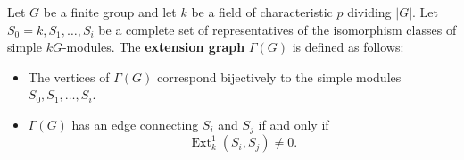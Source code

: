 Let $G$ be a finite group and let $k$ be a field of characteristic $p$ dividing $|G|$. Let $S_0 = k, S_1, \ldots, S_i$ be a complete set of representatives of the isomorphism classes of simple $kG$-modules. The \textbf{extension graph} $\Gamma(G)$ is defined as follows:
\begin{itemize}
\item The vertices of $\Gamma(G)$ correspond bijectively to the simple modules $S_0, S_1, \ldots, S_i$.
\item $\Gamma(G)$ has an edge connecting $S_i$ and $S_j$ if and only if
$$\operatorname{Ext}_k^1(S_i, S_j) \neq 0.$$
\end{itemize}
